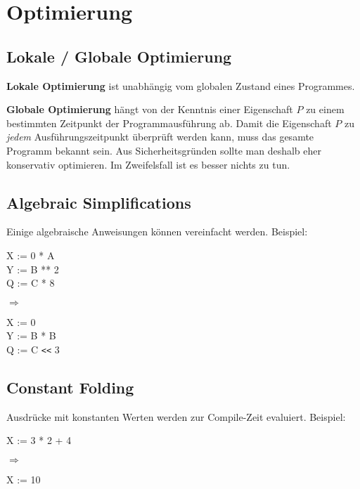 \section{Optimierung}

\subsection{Lokale / Globale Optimierung}

\textbf{Lokale Optimierung} ist unabhängig vom globalen Zustand eines
Programmes.

\textbf{Globale Optimierung} hängt von der Kenntnis einer Eigenschaft $P$ zu
einem bestimmten Zeitpunkt der Programmausführung ab. Damit die Eigenschaft $P$
zu \textit{jedem} Ausführungszeitpunkt überprüft werden kann, muss das gesamte
Programm bekannt sein. Aus Sicherheitsgründen sollte man deshalb eher
konservativ optimieren. Im Zweifelsfall ist es besser nichts zu tun.

\subsection{Algebraic Simplifications}

Einige algebraische Anweisungen können vereinfacht werden. Beispiel:

\begin{varwidth}{\textwidth}\ttfamily
X := 0 * A\\
Y := B ** 2\\
Q := C * 8
\end{varwidth}%
\hspace{1cm}$\Rightarrow$\hspace{1cm}%
\begin{varwidth}{\textwidth}\ttfamily
X := 0\\
Y := B * B\\
Q := C \verb|<<| 3
\end{varwidth}

\subsection{Constant Folding}

Ausdrücke mit konstanten Werten werden zur Compile-Zeit evaluiert. Beispiel:

\begin{varwidth}{\textwidth}\ttfamily
X := 3 * 2 + 4
\end{varwidth}%
\hspace{1cm}$\Rightarrow$\hspace{1cm}%
\begin{varwidth}{\textwidth}\ttfamily
X := 10
\end{varwidth}

